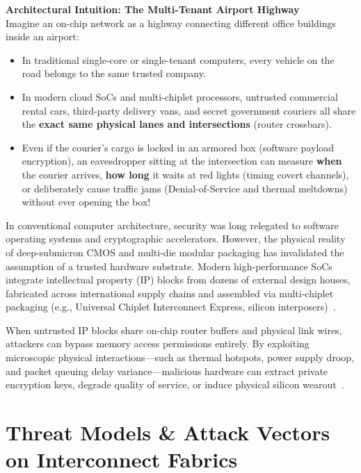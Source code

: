 \begin{svgraybox}
\textbf{Architectural Intuition: The Multi-Tenant Airport Highway} \\
Imagine an on-chip network as a highway connecting different office buildings inside an airport:
\begin{itemize}
    \item In traditional single-core or single-tenant computers, every vehicle on the road belongs to the same trusted company.
    \item In modern cloud SoCs and multi-chiplet processors, untrusted commercial rental cars, third-party delivery vans, and secret government couriers all share the \textbf{exact same physical lanes and intersections} (router crossbars).
    \item Even if the courier's cargo is locked in an armored box (software payload encryption), an eavesdropper sitting at the intersection can measure \textbf{when} the courier arrives, \textbf{how long} it waits at red lights (timing covert channels), or deliberately cause traffic jams (Denial-of-Service and thermal meltdowns) without ever opening the box!
\end{itemize}
\end{svgraybox}

In conventional computer architecture, security was long relegated to software operating systems and cryptographic accelerators. However, the physical reality of deep-submicron CMOS and multi-die modular packaging has invalidated the assumption of a trusted hardware substrate. Modern high-performance SoCs integrate intellectual property (IP) blocks from dozens of external design houses, fabricated across international supply chains and assembled via multi-chiplet packaging (e.g., Universal Chiplet Interconnect Express, silicon interposers)~\cite{Chen2026,UCIe2023}.

When untrusted IP blocks share on-chip router buffers and physical link wires, attackers can bypass memory access permissions entirely. By exploiting microscopic physical interactions—such as thermal hotspots, power supply droop, and packet queuing delay variance—malicious hardware can extract private encryption keys, degrade quality of service, or induce physical silicon wearout~\cite{Hasanzadeh2026Heat,Jaster2025Trust,Grover2025PUF}.

\section{Threat Models \& Attack Vectors on Interconnect Fabrics}
\label{sec:threat-models}

